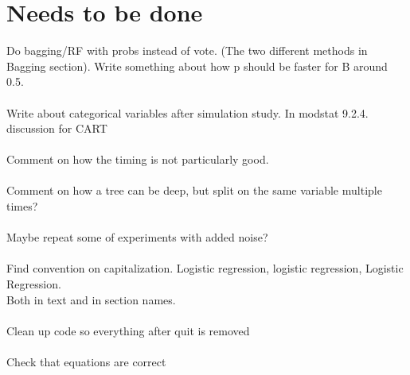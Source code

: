 \clearpage
\section{Needs to be done}
\label{sec:Needs to be done}
Do bagging/RF with probs instead of vote. (The two different methods in Bagging section). Write something about how p should be faster for B around 0.5.\\
\\
Write about categorical variables after simulation study. In modstat 9.2.4. discussion for CART\\
\\
Comment on how the timing is not particularly good. \\
\\
Comment on how a tree can be deep, but split on the same variable multiple times?\\
\\
Maybe repeat some of experiments with added noise?\\
\\
Find convention on capitalization. Logistic regression, logistic regression, Logistic Regression. \\
Both in text and in section names.\\
\\
Clean up code so everything after quit is removed\\
\\
Check that equations are correct\\
\\


